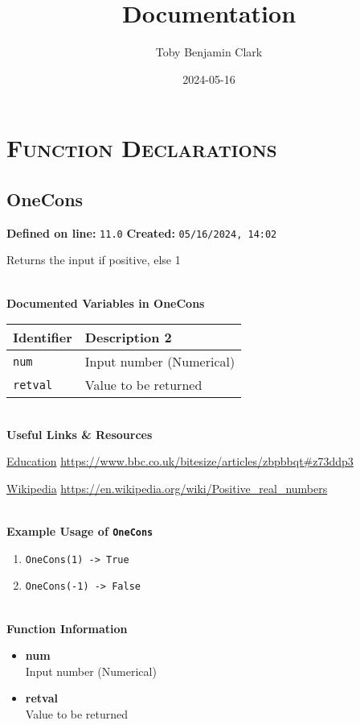 \documentclass{article}
\title{Documentation}
\author{Toby Benjamin Clark}
\date{2024-05-16}
\begin{document}
\maketitle
\clearpage
\tableofcontents
\clearpage

\section{\textsc{Function Declarations}}

\subsection{OneCons}

\textbf{Defined on line:} \verb|11.0| \hfill \textbf{Created:} \verb|05/16/2024, 14:02| 


Returns the input if positive, else 1

\textbf{ \\ Documented Variables in OneCons}
\begin{table}[htbp]
	\centering
	\begin{tabular}{|l|l|}
		\hline
		Identifier & Description 2 \\
		\hline
		 \texttt{num} & Input number (Numerical) \\
		\hline
		 \texttt{retval} & Value to be returned \\
		\hline
	\end{tabular}
\end{table}

 \textbf{ \\ Useful Links \& Resources}

\href{https://www.bbc.co.uk/bitesize/articles/zbpbbqt#z73ddp3}{Education} \hfill \url{https://www.bbc.co.uk/bitesize/articles/zbpbbqt#z73ddp3} 

\href{https://en.wikipedia.org/wiki/Positive_real_numbers}{Wikipedia} \hfill \url{https://en.wikipedia.org/wiki/Positive_real_numbers} 

\textbf{ \\ Example Usage of \texttt{OneCons}}
\begin{enumerate}
	\setlength{\itemsep}{0pt}
	\setlength{\parskip}{0pt}
	\setlength{\parsep}{0pt}
	\item \verb|OneCons(1) -> True|
	\item \verb|OneCons(-1) -> False|
\end{enumerate}

\textbf{ \\ Function Information}
\begin{itemize}
	\setlength{\itemsep}{0pt}
	\setlength{\parskip}{0pt}
	\setlength{\parsep}{0pt}
	\item \textbf{num} \\ Input number (Numerical)
	\item \textbf{retval} \\ Value to be returned
\end{itemize}
\end{document}
